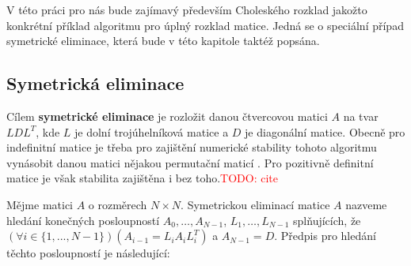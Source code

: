 \documentclass[11pt,american,czech,oneside]{book}
\theoremstyle{plain}
\theoremstyle{definition}
\newcommand{\TODO}[1]{\textcolor{red}{TODO: #1}}
\begin{document}
V této práci pro nás bude zajímavý především Choleského rozklad jakožto konkrétní příklad algoritmu pro úplný rozklad matice. Jedná se o speciální případ symetrické eliminace, která bude v této kapitole taktéž popsána. 

\subsection{Symetrická eliminace}

Cílem \textbf{symetrické eliminace} je rozložit danou čtvercovou matici $A$ na tvar $LDL^T$, kde $L$ je dolní trojúhelníková matice a $D$ je diagonální matice. Obecně pro indefinitní matice je třeba pro zajištění numerické stability tohoto algoritmu vynásobit danou matici nějakou permutační maticí \cite{fomo:67}. Pro pozitivně definitní matice je však stabilita zajištěna i bez toho.\TODO{cite}

Mějme matici $A$ o rozměrech $N \times N$. Symetrickou eliminací matice $A$ nazveme hledání konečných posloupností $A_0,\ldots,A_{N-1}$, $L_1,\ldots,L_{N-1}$ splňujících, že $\left(\forall i \in \{1,...,N-1\}\right)\left(A_{i-1}=L_i A_i L_i^T \right)$ a $A_{N-1}=D$.
Předpis pro hledání těchto posloupností je následující:
\end{document}

